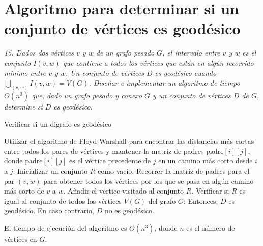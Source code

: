 \documentclass{article}
\begin{document}
\section*{Algoritmo para determinar si un conjunto de vértices es geodésico}
\textit{15. Dados dos vértices \( v \) y \( w \) de un grafo pesado \( G \), el intervalo entre \( v \) y \( w \) es el conjunto \( I(v, w) \) que contiene a todos los vértices que están en algún recorrido mínimo entre \( v \) y \( w \). Un conjunto de vértices \( D \) es geodésico cuando \( \bigcup_{(v,w)} I(v,w) = V(G) \). Diseñar e implementar un algoritmo de tiempo \( O(n^3) \) que, dado un grafo pesado y conexo \( G \) y un conjunto de vértices \( D \) de \( G \), determine si \( D \) es geodésico.}
\begin{algorithm}
\caption{Verificar si un digrafo es geodésico}
\label{alg:geodesic_check}

\begin{algorithmic}[1]
\STATE Utilizar el algoritmo de Floyd-Warshall para encontrar las distancias más cortas entre todos los pares de vértices y mantener la matriz de padres $\text{padre}[i][j]$, donde $\text{padre}[i][j]$ es el vértice precedente de $j$ en un camino más corto desde $i$ a $j$.
\STATE Inicializar un conjunto $R$ como vacío.
    \STATE Recorrer la matriz de padres para el par $(v, w)$ para obtener todos los vértices por los que se pasa en algún camino más corto de $v$ a $w$.
        \STATE Añadir el vértice visitado al conjunto $R$.
    \ENDFOR
\ENDFOR
\STATE Verificar si $R$ es igual al conjunto de todos los vértices $V(G)$ del grafo $G$:
        \STATE Entonces, $D$ es geodésico.
    \ELSE
        \STATE En caso contrario, $D$ no es geodésico.
    \ENDIF
\end{algorithmic}

\end{algorithm}

El tiempo de ejecución del algoritmo es \( O(n^3) \), donde \( n \) es el número de vértices en \( G \).
\end{document}
